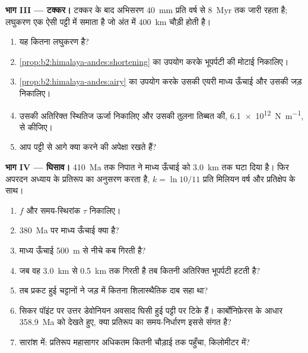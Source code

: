 \begin{problem}
\noindent\textbf{भाग III --- टक्कर।} टक्कर के बाद अभिसरण
\qty{40}{mm} प्रति वर्ष से \qty{8}{Myr} तक जारी रहता है; लघुकरण एक ऐसी पट्टी में समाता है जो अंत में
\qty{400}{km} चौड़ी होती है।
\begin{enumerate}[resume]
\item यह कितना लघुकरण है?
\item \cref{prop:b2:himalaya-andes:shortening} का उपयोग करके भूपर्पटी की मोटाई निकालिए।
\item \cref{prop:b2:himalaya-andes:airy} का उपयोग करके उसकी एयरी माध्य ऊँचाई और उसकी जड़ निकालिए।
\item उसकी अतिरिक्त स्थितिज ऊर्जा निकालिए और उसकी तुलना तिब्बत की,
\qty{6.1e12}{N.m^{-1}}, से कीजिए।
\item आप पट्टी से आगे क्या करने की अपेक्षा रखते हैं?
\end{enumerate}

\noindent\textbf{भाग IV --- घिसाव।} \qty{410}{Ma} तक निपात ने माध्य
ऊँचाई को \qty{3.0}{km} तक घटा दिया है। फिर अपरदन अध्याय के प्रतिरूप का अनुसरण करता है, $k = \ln
10/11$ प्रति मिलियन वर्ष और प्रतिक्षेप के साथ।
\begin{enumerate}[resume]
\item $f$ और समय-स्थिरांक $\tau$ निकालिए।
\item \qty{380}{Ma} पर माध्य ऊँचाई क्या है?
\item माध्य ऊँचाई \qty{500}{m} से नीचे कब गिरती है?
\item जब वह \qty{3.0}{km} से \qty{0.5}{km} तक गिरती है तब कितनी अतिरिक्त भूपर्पटी हटती है?
\item तब प्रकट हुई चट्टानों ने जड़ में कितना शिलास्थैतिक दाब सहा था?
\item सिकर पॉइंट पर उत्तर डेवोनियन अवसाद घिसी हुई पट्टी पर टिके हैं। कार्बोनिफ़ेरस के आधार
\qty{358.9}{Ma} को देखते हुए, क्या प्रतिरूप का समय-निर्धारण इससे संगत है?
\item सारांश में: प्रतिरूप महासागर अधिकतम कितनी चौड़ाई तक पहुँचा, किलोमीटर में?
\end{enumerate}
\end{problem}
